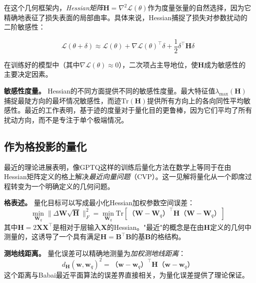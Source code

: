 \documentclass[letterpaper,twocolumn,10pt]{article}
\begin{document}
在这个几何框架内，\emph{Hessian矩阵}$\mathbf{H} = \nabla^2 \mathcal{L}(\theta)$作为度量张量的自然选择，因为它精确地表征了损失表面的局部曲率。具体来说，Hessian捕捉了损失对参数扰动的二阶敏感性：

\begin{equation}
\mathcal{L}(\theta + \delta) \approx \mathcal{L}(\theta) + \nabla \mathcal{L}(\theta)^\top \delta + \frac{1}{2} \delta^\top \mathbf{H} \delta
\end{equation}

在训练好的模型中（其中$\nabla \mathcal{L}(\theta) \approx 0$），二次项占主导地位，使$\mathbf{H}$成为敏感性的主要决定因素。

\textbf{敏感性度量。} Hessian的不同方面提供不同的敏感性度量。最大特征值$\lambda_{\max}(\mathbf{H})$捕捉最陡方向的最坏情况敏感性，而迹$\text{Tr}(\mathbf{H})$提供所有方向上的各向同性平均敏感性。最近的工作\cite{frantar2022gptq}表明，基于迹的度量对于量化目的更鲁棒，因为它们平均了所有扰动方向，而不是专注于单个极端情况。

\subsection{作为格投影的量化}

最近的理论进展表明，像GPTQ这样的训练后量化方法在数学上等同于在由Hessian矩阵定义的格上解决\emph{最近向量问题}（CVP）\cite{frantar2022gptq}。这一见解将量化从一个即席过程转变为一个明确定义的几何问题。

\textbf{格表述。} 量化目标可以写成最小化Hessian加权参数空间误差：
\begin{equation}
\min_{\mathbf{W}_q} \|\Delta \mathbf{W} \sqrt{\mathbf{H}}\|_F^2 = \min_{\mathbf{W}_q} \text{Tr}[（\mathbf{W} - \mathbf{W}_q）^\top \mathbf{H}（\mathbf{W} - \mathbf{W}_q）]
\end{equation}
其中$\mathbf{H} = 2\mathbf{X}\mathbf{X}^\top$是相对于层输入$\mathbf{X}$的Hessian。"最近"的概念是在由$\mathbf{H}$定义的几何中测量的，这诱导了一个具有满足$\mathbf{H} = \mathbf{B}^\top \mathbf{B}$的基$\mathbf{B}$的格结构。

\textbf{测地线距离。} 量化误差可以精确地测量为\emph{加权测地线距离}：
\begin{equation}
d_{\mathbf{H}}(\mathbf{w}, \mathbf{w}_q)^2 = （\mathbf{w} - \mathbf{w}_q）^\top \mathbf{H}（\mathbf{w} - \mathbf{w}_q）
\label{eq:geodesic_distance}
\end{equation}
这个距离与Babai最近平面算法的误差界直接相关\cite{agrell2023lattice}，为量化误差提供了理论保证。
\end{document}
